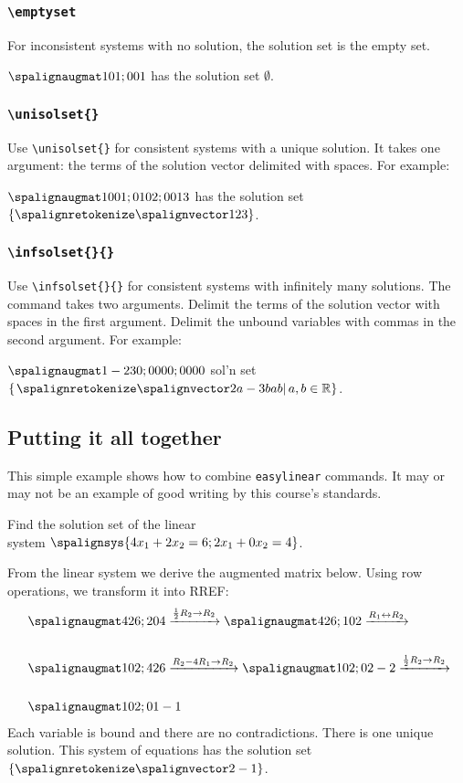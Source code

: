 \documentclass{article}
\begin{document}
\subsubsection{\texttt{\textbackslash emptyset}}
For inconsistent systems with no solution, the solution set is the empty set.

\LTXexample[style=A]
$\amat{1 0 1; 0 0 1}$ has the solution set     $\emptyset$.
\endLTXexample

\subsubsection{\texttt{\textbackslash unisolset\{\}}}

Use \verb=\unisolset{}= for consistent systems with a unique solution. It takes one argument: the terms of the solution vector delimited with spaces. For example:

\LTXexample[style=A]
$\amat{1 0 0 1; 0 1 0 2; 0 0 1 3}$ has the solution set $\unisolset{1 2 3}$.
\endLTXexample

\subsubsection{\texttt{\textbackslash infsolset\{\}\{\}}}

Use \verb=\infsolset{}{}= for consistent systems with infinitely many solutions. The command takes two arguments. Delimit the terms of the solution vector with spaces in the first argument. Delimit the unbound variables with commas in the second argument. For example:

\LTXexample[style=A]
$\amat{1 -2 3 0; 0 0 0 0; 0 0 0 0}$ sol'n set $\infsolset{2a-3b a b}{a,b}$.
\endLTXexample

\subsection{Putting it all together}
This simple example shows how to combine \texttt{easylinear} commands. It may or may not be an example of good writing by this course's standards.
\LTXexample[style=A]
\begin{problem}Find the solution set of the linear\\ system $\spalignsys{4x_1 + 2x_2 = 6; 2x_1 + 0x_2 = 4}$.
\end{problem}

From the linear system we derive the augmented matrix below. Using row operations, we transform it into RREF:
\begin{align*}
&\amat{4 2 6; 2 0 4}
\rowscale{\frac{1}{2}}{2}
\amat{4 2 6; 1 0 2}
\rowswap{1}{2}\\~\\
&\amat{1 0 2; 4 2 6}
\rowop{}{2}{-}{4}{1}
\amat{1 0 2; 0 2 -2}
\rowscale{\frac{1}{2}}{2}\\~\\
&\amat{1 0 2; 0 1 -1}
\end{align*}
Each variable is bound and there are no contradictions. There is one unique solution. This system of equations has the solution set $\unisolset{2 -1}$.
\endLTXexample
\pagebreak
\end{document}
